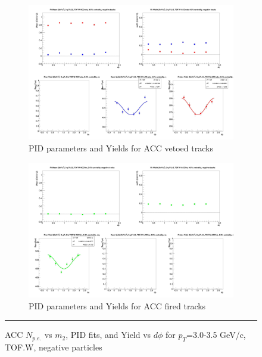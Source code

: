 \begin{figure}[H]
  \ContinuedFloat
    \begin{subfigure}{1\textwidth}
    \includegraphics[width=1\textwidth]{hiptfits/neg/fitParams_tof2_cent0_ch0_pT-30-35.jpg}
    \caption{PID parameters and Yields for ACC vetoed tracks}
    \end{subfigure}    
    \begin{subfigure}{1\textwidth}
    \includegraphics[width=1\textwidth]{hiptfits/neg/fitParams_tof3_cent0_ch0_pT-30-35.jpg}
    \caption{PID parameters and Yields for ACC fired tracks}
    \end{subfigure} 
    \rule{35em}{0.5pt}
  \caption[ACC $N_{p.e.}$ vs $m_2$, PID fits, and Yield vs $d\phi$ for $p_T$=3.0-3.5 GeV/c, TOF.W, negative particles]{ACC $N_{p.e.}$ vs $m_2$, PID fits, and Yield vs $d\phi$ for $p_T$=3.0-3.5 GeV/c, TOF.W, negative particles}
  \label{fig:acc30-35neg}
\end{figure}

